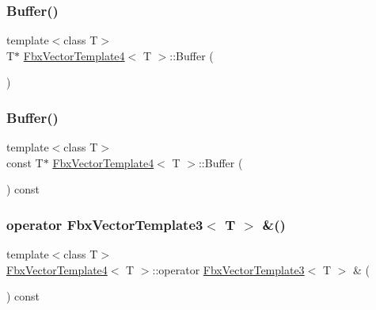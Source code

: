 \subsubsection{\texorpdfstring{Buffer()}{Buffer()}\hspace{0.1cm}{\footnotesize\ttfamily [1/2]}}
{\footnotesize\ttfamily template$<$class T$>$ \\
T$\ast$ \hyperlink{class_fbx_vector_template4}{Fbx\+Vector\+Template4}$<$ T $>$\+::Buffer (\begin{DoxyParamCaption}{ }\end{DoxyParamCaption})}

\mbox{\label{class_fbx_vector_template4_acba44ad0f935fc8917e4f01d113da317}} 
\subsubsection{\texorpdfstring{Buffer()}{Buffer()}\hspace{0.1cm}{\footnotesize\ttfamily [2/2]}}
{\footnotesize\ttfamily template$<$class T$>$ \\
const T$\ast$ \hyperlink{class_fbx_vector_template4}{Fbx\+Vector\+Template4}$<$ T $>$\+::Buffer (\begin{DoxyParamCaption}{ }\end{DoxyParamCaption}) const}

\mbox{\label{class_fbx_vector_template4_a7e7ab0b2ffa89ed3ed6efbb079661175}} 
\subsubsection{\texorpdfstring{operator Fbx\+Vector\+Template3$<$ T $>$ \&()}{operator FbxVectorTemplate3< T > \&()}}
{\footnotesize\ttfamily template$<$class T$>$ \\
\hyperlink{class_fbx_vector_template4}{Fbx\+Vector\+Template4}$<$ T $>$\+::operator \hyperlink{class_fbx_vector_template3}{Fbx\+Vector\+Template3}$<$ T $>$ \& (\begin{DoxyParamCaption}{ }\end{DoxyParamCaption}) const}

